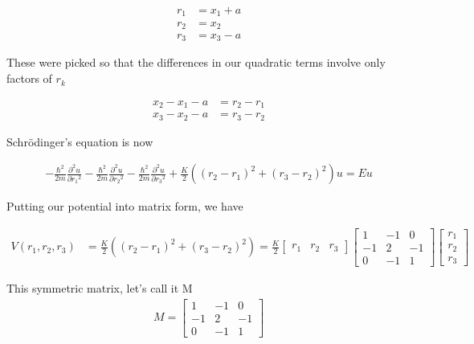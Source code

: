 \begin{align}\label{eqn:desaiCh9:701}
r_1 &= x_1 + a \\
r_2 &= x_2 \\
r_3 &= x_3 - a
\end{align}

These were picked so that the differences in our quadratic terms involve only factors of $r_k$

\begin{align}\label{eqn:desaiCh9:702}
x_2 - x_1 - a &= r_2 - r_1 \\
x_3 - x_2 - a &= r_3 - r_2
\end{align}

Schr\"{o}dinger's equation is now

\begin{align}\label{eqn:desaiCh9:700a}
-\frac{\hbar^2}{2m} \frac{\partial^2 u}{\partial {r_1}^2}
-\frac{\hbar^2}{2m} \frac{\partial^2 u}{\partial {r_2}^2}
-\frac{\hbar^2}{2m} \frac{\partial^2 u}{\partial {r_3}^2}
+ \frac{K}{2}
\left(
(r_2 - r_1)^2
+(r_3 - r_2)^2
\right) u
= E u
\end{align}

Putting our potential into matrix form, we have

\begin{align}\label{eqn:desaiCh9:703}
V(r_1, r_2, r_3) &=
\frac{K}{2}
\left(
(r_2 - r_1)^2
+(r_3 - r_2)^2
\right)
=
\frac{K}{2}
\begin{bmatrix}
r_1 & r_2 & r_3
\end{bmatrix}
\begin{bmatrix}
1 & -1 & 0 \\
-1 & 2 & -1 \\
0 & -1 & 1
\end{bmatrix}
\begin{bmatrix}
r_1 \\ r_2 \\ r_3
\end{bmatrix}
\end{align}

This symmetric matrix, let's call it M
\begin{align}\label{eqn:desaiCh9:704}
M=
\begin{bmatrix}
1 & -1 & 0 \\
-1 & 2 & -1 \\
0 & -1 & 1
\end{bmatrix}
\end{align}

